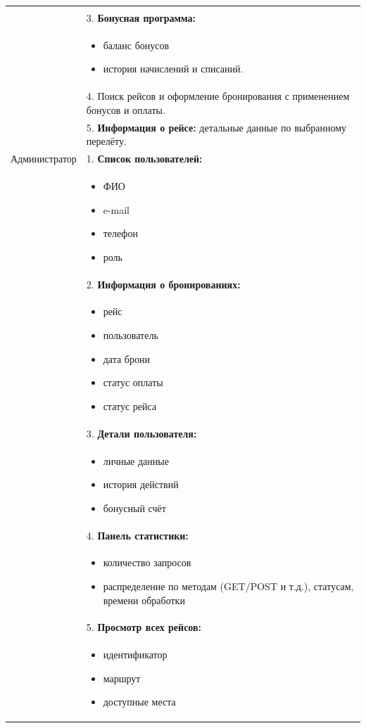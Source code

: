 \begin{longtable}{|p{5cm}|p{11.5cm}|}
\begin{itemize}
    \end{itemize} \\
    & 3. \textbf{Бонусная программа:} \\
    & \begin{itemize}
        \item баланс бонусов
        \item история начислений и списаний.
    \end{itemize} \\ 
    & 4. Поиск рейсов и оформление бронирования с применением бонусов и оплаты. \\
    & 5. \textbf{Информация о рейсе:} детальные данные по выбранному перелёту. \\
    \hline
    Администратор &
    1. \textbf{Список пользователей:} \\
    & \begin{itemize}
        \item ФИО
        \item e-mail
        \item телефон
        \item роль
    \end{itemize} \\
    & 2. \textbf{Информация о бронированиях:} \\
    & \begin{itemize}
        \item рейс
        \item пользователь
        \item дата брони
        \item статус оплаты
        \item статус рейса
    \end{itemize} \\
    & 3. \textbf{Детали пользователя:} \\
    & \begin{itemize}
        \item личные данные
        \item история действий
        \item бонусный счёт
    \end{itemize} \\
    & 4. \textbf{Панель статистики:} \\
    & \begin{itemize}
        \item количество запросов
        \item распределение по методам (GET/POST и т.д.), статусам, времени обработки
    \end{itemize} \\
    & 5. \textbf{Просмотр всех рейсов:} \\
    & \begin{itemize}
        \item идентификатор
        \item маршрут
        \item доступные места
    \end{itemize} \\
    \hline
\end{longtable}

